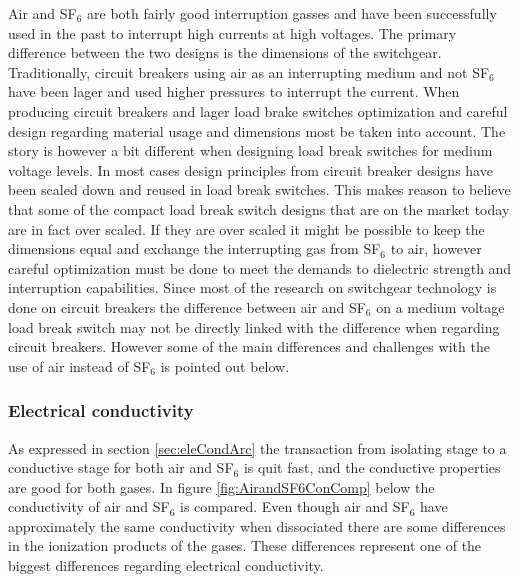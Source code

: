 \documentclass[10pt,a4paper]{article} %
\begin{document}
Air and SF$_6$ are both fairly good interruption gasses and have been successfully used in the past to interrupt high currents at high voltages. The primary difference between the two designs is the dimensions of the switchgear. Traditionally, circuit breakers using air as an interrupting medium and not SF$_6$ have been lager and used higher pressures to interrupt the current. When producing circuit breakers and lager load brake switches optimization and careful design regarding material usage and dimensions most be taken into account. The story is however a bit different when designing load break switches for medium voltage levels. In most cases design principles from circuit breaker designs have been scaled down and reused in load break switches. This makes reason to believe that some of the compact load break switch designs that are on the market today are in fact over scaled. If they are over scaled it might be possible to keep the dimensions equal and exchange the interrupting gas from SF$_6$ to air, however careful optimization must be done to meet the demands to dielectric strength and interruption capabilities. Since most of the research on switchgear technology is done on circuit breakers the difference between air and SF$_6$ on a medium voltage load break switch may not be directly linked with the difference when regarding circuit breakers. However some of the main differences and challenges with the use of air instead of SF$_6$ is pointed out below.

\subsubsection*{Electrical conductivity}
As expressed in section \ref{sec:eleCondArc} the transaction from isolating stage to a conductive stage for both air and SF$_6$ is quit fast, and the conductive properties are good for both gases. In figure \ref{fig:AirandSF6ConComp} below the conductivity of air and SF${_6}$ is compared. Even though air and SF$_6$ have approximately the same conductivity when dissociated there are some differences in the ionization products of the gases. These differences represent one of the biggest differences regarding electrical conductivity.
\end{document}
